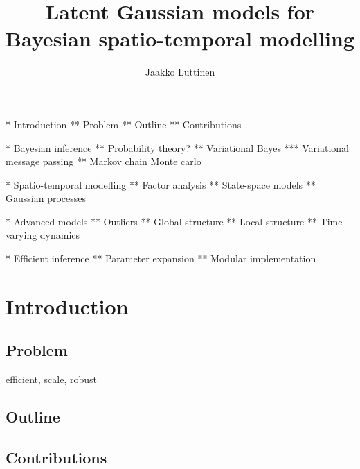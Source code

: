 \documentclass[dissertation,draft]{aaltoseries}
\author{Jaakko Luttinen}
\title{Latent Gaussian models for Bayesian spatio-temporal modelling}
\begin{document}
\draftabstract{\lipsum[1-3]}
\draftabstract[finnish]{\lipsum[4-6]}
\draftabstract[swedish]{\lipsum[7-9]}

\begin{preface}
\lipsum[1-4]
\end{preface}

\tableofcontents

\listofpublications






* Introduction
** Problem
** Outline
** Contributions

* Bayesian inference
** Probability theory?
** Variational Bayes
*** Variational message passing
** Markov chain Monte carlo

* Spatio-temporal modelling
** Factor analysis
** State-space models
** Gaussian processes

* Advanced models
** Outliers
** Global structure
** Local structure
** Time-varying dynamics

* Efficient inference
** Parameter expansion
** Modular implementation

\chapter{Introduction}

\section{Problem}
efficient, scale, robust

\section{Outline}

\section{Contributions}
\end{document}
